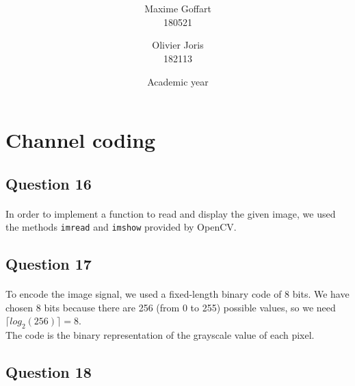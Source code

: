 \documentclass[a4paper, 11pt, oneside]{article}
\title{\ClassName\\\vspace*{0.8cm}\ProjectName\vspace{1cm}}
\author{Maxime Goffart \\180521 \and Olivier Joris\\182113}
\date{\vspace{1cm}Academic year \AcademicYear}
\begin{document}
\begin{titlingpage}
{\let\newpage\relax\maketitle}
\end{titlingpage}

\thispagestyle{empty}
\newpage







\section{Channel coding}

\subsection{Question 16}
\paragraph{}In order to implement a function to read and display the given image, we used the methods \texttt{imread} and \texttt{imshow} provided by OpenCV.


\subsection{Question 17}
\paragraph{}To encode the image signal, we used a fixed-length binary code of 8 bits. We have chosen 8 bits because there are 256 (from 0 to 255) possible values, so we need $\lceil log_2(256) \rceil =8$.\\
The code is the binary representation of the grayscale value of each pixel.


\subsection{Question 18}
\end{document}
